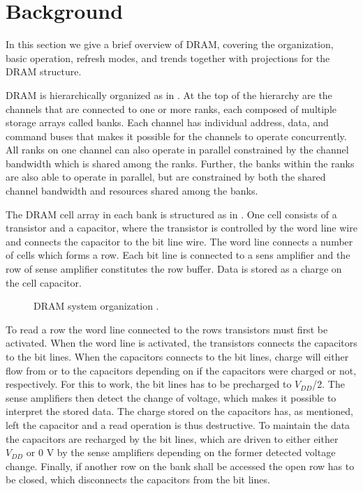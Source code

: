 \section{Background} 
\label{sec:bg}
In this section we give a brief overview of DRAM, covering the organization, basic operation, refresh modes, and trends together with projections for the DRAM structure.

DRAM is hierarchically organized as in . At the top of the hierarchy are the channels that are connected to one or more ranks, each composed of multiple storage arrays called banks. Each channel has individual address, data, and command buses that makes it possible for the channels to operate concurrently. All ranks on one channel can also operate in parallel constrained by the channel bandwidth which is shared among the ranks. Further, the banks within the ranks are also able to operate in parallel, but are constrained by both the shared channel bandwidth and resources shared among the banks. 

The DRAM cell array in each bank is structured as in . One cell consists of a transistor and a capacitor, where the transistor is controlled by the word line wire and connects the capacitor to the bit line wire. The word line connects a number of cells which forms a row. Each bit line is connected to a sens amplifier and the row of sense amplifier constitutes the row buffer. Data is stored as a charge on the cell capacitor.

\begin{figure*}[t]
    \centering
	\caption{DRAM system organization \cite{raidr}.}
	\label{fig:dram_org}
\end{figure*}

To read a row the word line connected to the rows transistors must first be activated. When the word line is activated, the transistors connects the capacitors to the bit lines. When the capacitors connects to the bit lines, charge will either flow from or to the capacitors depending on if the capacitors were charged or not, respectively. For this to work, the bit lines has to be precharged to \(V_{DD}\)/2. The sense amplifiers then detect the change of voltage, which makes it possible to interpret the stored data. The charge stored on the capacitors has, as mentioned, left the capacitor and a read operation is thus destructive. To maintain the data the capacitors are recharged by the bit lines, which are driven to either either \(V_{DD}\) or 0 V by the sense amplifiers depending on the former detected voltage change. Finally, if another row on the bank shall be accessed the open row has to be closed, which disconnects the capacitors from the bit lines.

